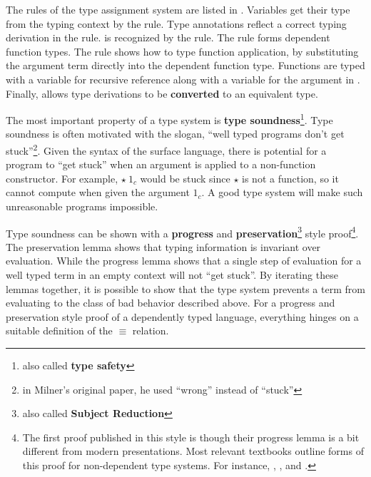 The rules of the type assignment system are listed in .
Variables get their type from the typing context by the  rule.
Type annotations reflect a correct typing derivation in the  rule.
\Tit{} is recognized by the  rule.
The  rule forms dependent function types.
The  rule shows how to type function application, by substituting the argument term directly into the dependent function type.
Functions are typed with a variable for recursive reference along with a variable for the argument in .
Finally,  allows type derivations to be \textbf{converted} to an equivalent type.
 
The most important property of a type system is \textbf{type soundness}\footnote{also called \textbf{type safety}}.
Type soundness is often motivated with the slogan, ``well typed programs don't get stuck''\cite{MILNER1978348}\footnote{in Milner's original paper, he used ``wrong'' instead of ``stuck''}.
Given the syntax of the surface language, there is potential for a program to ``get stuck'' when an argument is applied to a non-function constructor.
For example, $\star\ 1_{c}$ would be stuck since $\star$ is not a function, so it cannot compute when given the argument $1_{c}$.
A good type system will make such unreasonable programs impossible.
 
Type soundness can be shown with a \textbf{progress} and \textbf{preservation}\footnote{also called \textbf{Subject Reduction}} style proof\footnote{
 The first proof published in this style is \cite{WRIGHT199438} though their progress lemma is a bit different from modern presentations.
 Most relevant textbooks outline forms of this proof for non-dependent type systems.
 For instance, \cite[Part 2]{pierce2002types}, \cite{KOKKE2020102440}, and \cite[Chapter 11]{chlipala2017formal}.
 }.
The preservation lemma shows that typing information is invariant over evaluation.
While the progress lemma shows that a single step of evaluation for a well typed term in an empty context will not ``get stuck''.
By iterating these lemmas together, it is possible to show that the type system prevents a term from evaluating to the class of bad behavior described above.
For a progress and preservation style proof of a dependently typed language, everything hinges on a suitable definition of the $\equiv$ relation.
 

